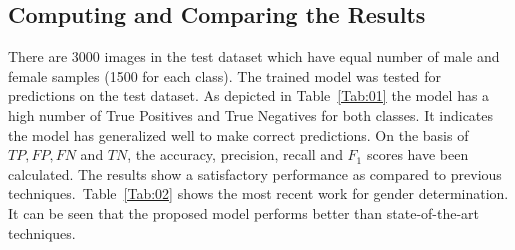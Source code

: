 \documentclass{bioinfo}
\begin{document}
\begin{methods}
                           
 \subsection{Computing and Comparing the Results}

There are 3000 images in the test dataset which have equal number of male and female samples (1500 for each class). The trained model was tested for predictions on the test dataset. As depicted in Table~\ref{Tab:01} the model has a high number of True Positives and True Negatives for both classes. It indicates the model has generalized well to make correct predictions. On the basis of $TP, FP, FN$ and $TN$, the accuracy, precision, recall and $F_1$ scores have been calculated. The results show a satisfactory performance as compared to previous techniques.~Table~\ref{Tab:02} shows the most recent work for gender determination. It can be seen that the proposed model performs better than state-of-the-art techniques.


\end{methods}
\end{document}
